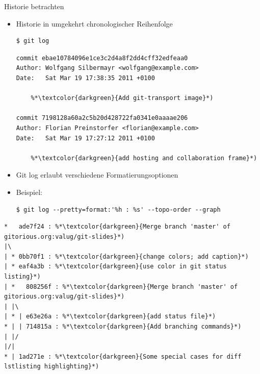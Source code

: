 \begin{frame}{Historie betrachten}
  \begin{itemize}
    \item Historie in umgekehrt chronologischer Reihenfolge
    \begin{lstlisting}
$ git log
    \end{lstlisting}
  \begin{lstlisting}[frame=single]
commit ebae10784096e1ce3c2d4a8f2dd4cff32edfeaa0
Author: Wolfgang Silbermayr <wolfgang@example.com>
Date:   Sat Mar 19 17:38:35 2011 +0100

    %*\textcolor{darkgreen}{Add git-transport image}*)

commit 7198128a60a2c5b20d428722fa0341e0aaaae206
Author: Florian Preinstorfer <florian@example.com>
Date:   Sat Mar 19 17:27:12 2011 +0100

    %*\textcolor{darkgreen}{add hosting and collaboration frame}*)
  \end{lstlisting}
  \framebreak

    \item Git log erlaubt verschiedene Formatierungsoptionen
    \item Beispiel:
    \begin{lstlisting}
$ git log --pretty=format:'%h : %s' --topo-order --graph
    \end{lstlisting}
  \end{itemize}
  \begin{lstlisting}[frame=single]
*   ade7f24 : %*\textcolor{darkgreen}{Merge branch 'master' of gitorious.org:valug/git-slides}*)
|\
| * 0bb70f1 : %*\textcolor{darkgreen}{change colors; add caption}*)
| * eaf4a3b : %*\textcolor{darkgreen}{use color in git status listing}*)
| *   808256f : %*\textcolor{darkgreen}{Merge branch 'master' of gitorious.org:valug/git-slides}*)
| |\
| * | e63e26a : %*\textcolor{darkgreen}{add status file}*)
* | | 714815a : %*\textcolor{darkgreen}{Add branching commands}*)
| |/
|/|
* | 1ad271e : %*\textcolor{darkgreen}{Some special cases for diff lstlisting highlighting}*)
  \end{lstlisting}
\end{frame}

